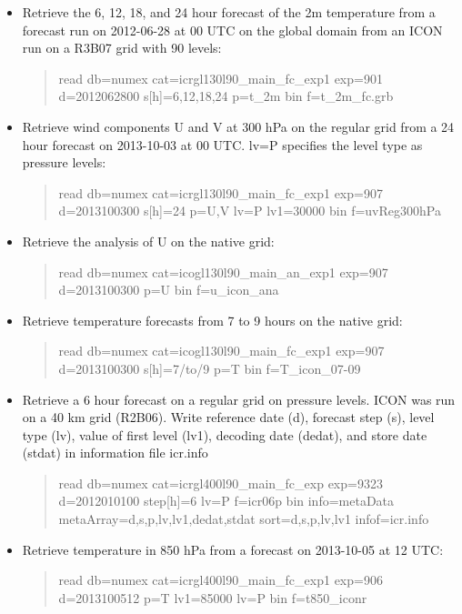 \begin{itemize}
\item Retrieve the 6, 12, 18, and 24 hour forecast of the 2m temperature from a forecast
run on 2012-06-28 at 00 UTC on the global domain from an ICON run on a R3B07 grid with 90 levels:

\begin{quote}
read db=numex cat=icrgl130l90\_main\_fc\_exp1 exp=901 d=2012062800 s[h]=6,12,18,24 p=t\_2m bin f=t\_2m\_fc.grb
\end{quote}

\item Retrieve wind components U and V at 300 hPa on the regular grid from a 24 hour forecast on
2013-10-03 at 00 UTC. lv=P specifies the level type as pressure levels:

\begin{quote}
read db=numex cat=icrgl130l90\_main\_fc\_exp1 exp=907 d=2013100300 s[h]=24 p=U,V lv=P lv1=30000 bin f=uvReg300hPa
\end{quote}

\item Retrieve the analysis of U on the native grid:
\begin{quote}
read db=numex cat=icogl130l90\_main\_an\_exp1 exp=907 d=2013100300 p=U bin f=u\_icon\_ana
\end{quote}

\item Retrieve temperature forecasts from 7 to 9 hours on the native grid:
\begin{quote}
read db=numex cat=icogl130l90\_main\_fc\_exp1 exp=907 d=2013100300 s[h]=7/to/9 p=T bin f=T\_icon\_07-09
\end{quote}

\item Retrieve a 6 hour forecast on a regular grid on pressure levels. ICON was run on a 40 km
grid (R2B06).  Write reference date (d),
forecast step (s), level type (lv), value of first level (lv1), decoding date (dedat), and
store date (stdat) in information file icr.info

\begin{quote}
read db=numex cat=icrgl400l90\_main\_fc\_exp exp=9323 d=2012010100 step[h]=6 lv=P f=icr06p bin info=metaData metaArray=d,s,p,lv,lv1,dedat,stdat sort=d,s,p,lv,lv1 infof=icr.info
\end{quote}

\item Retrieve temperature in 850 hPa from a forecast on 2013-10-05 at 12 UTC:

\begin{quote}
read db=numex cat=icrgl400l90\_main\_fc\_exp1 exp=906 d=2013100512 p=T lv1=85000 lv=P bin f=t850\_iconr
\end{quote}

\end{itemize}
